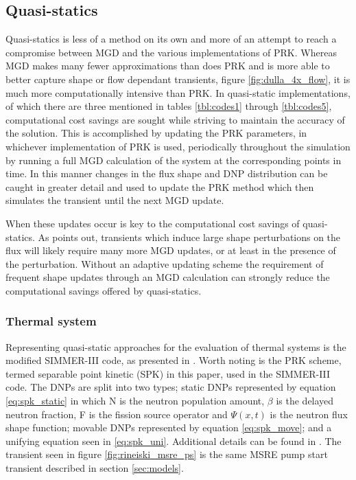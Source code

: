 \documentclass[review]{elsarticle}
\begin{document}
\subsection{Quasi-statics} \label{ssec:qs}
Quasi-statics is less of a method on its own and more of an attempt to
reach a compromise between MGD and the various implementations of PRK. Whereas
MGD makes many fewer approximations than does PRK and is more able to better
capture shape or flow dependant transients, figure \ref{fig:dulla_4x_flow},
it is much more computationally intensive than PRK. In quasi-static
implementations, of which there are three mentioned in tables \ref{tbl:codes1}
through \ref{tbl:codes5},
computational cost savings are sought while striving to maintain the accuracy
of the solution. This is accomplished by updating the PRK parameters, in
whichever implementation of PRK is used, periodically throughout the simulation
by running a full MGD calculation of the system at the corresponding points
in time. In this manner changes in the flux shape and DNP distribution can
be caught in greater detail and used to update the PRK method which then 
simulates the transient until the next MGD update.
\par When these updates occur is key to the computational cost savings of
quasi-statics. As \cite{dulla_models_2005} points out, transients which induce
large shape perturbations on the flux will likely require many more MGD
updates, or at least in the presence of the perturbation. Without an adaptive
updating scheme the requirement of frequent shape updates through an MGD
calculation can strongly reduce the computational savings offered by
quasi-statics.

\subsubsection{Thermal system} \label{sssec:qs_therm}
Representing quasi-static approaches for the evaluation of thermal systems
is the modified SIMMER-III code, as presented in \cite{rineiski_kinetics_2005}.
Worth noting is the PRK scheme, termed separable point kinetic (SPK) in this
paper, used in the SIMMER-III code. The DNPs are split into two types;
static DNPs represented by equation \ref{eq:spk_static} in which N is the
neutron
population amount, $\beta$ is the delayed neutron fraction, F is the fission
source operator and $\Psi(x,t)$ is the neutron flux shape function;
 movable DNPs represented by
equation \ref{eq:spk_move}; and a unifying equation seen in \ref{eq:spk_uni}.
Additional details can be found in \cite{rineiski_kinetics_2005}. The transient
seen in figure \ref{fig:rineiski_msre_ps} is the same MSRE pump start transient
described in section \ref{sec:models}.
\end{document}
